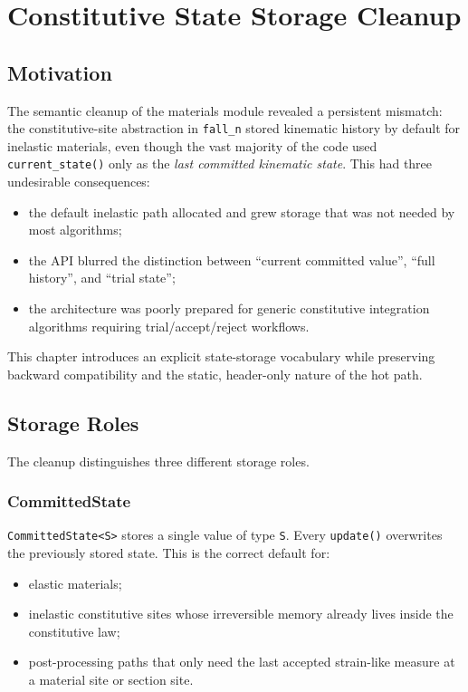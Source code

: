 \chapter{Constitutive State Storage Cleanup}

\section{Motivation}

The semantic cleanup of the materials module revealed a persistent mismatch:
the constitutive-site abstraction in \texttt{fall\_n} stored kinematic history
by default for inelastic materials, even though the vast majority of the code
used \texttt{current\_state()} only as the \emph{last committed kinematic
state}.  This had three undesirable consequences:

\begin{itemize}
  \item the default inelastic path allocated and grew storage that was not
        needed by most algorithms;
  \item the API blurred the distinction between ``current committed value'',
        ``full history'', and ``trial state'';
  \item the architecture was poorly prepared for generic constitutive
        integration algorithms requiring trial/accept/reject workflows.
\end{itemize}

This chapter introduces an explicit state-storage vocabulary while preserving
backward compatibility and the static, header-only nature of the hot path.

\section{Storage Roles}

The cleanup distinguishes three different storage roles.

\subsection{CommittedState}

\texttt{CommittedState<S>} stores a single value of type \texttt{S}.  Every
\texttt{update()} overwrites the previously stored state.  This is the correct
default for:

\begin{itemize}
  \item elastic materials;
  \item inelastic constitutive sites whose irreversible memory already lives
        inside the constitutive law;
  \item post-processing paths that only need the last accepted strain-like
        measure at a material site or section site.
\end{itemize}

